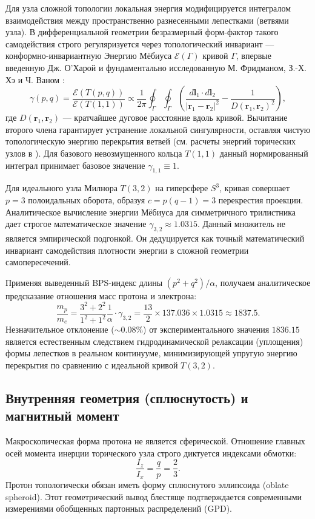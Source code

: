 \documentclass[11pt,a4paper]{article}
\begin{document}
Для узла сложной топологии локальная энергия модифицируется интегралом взаимодействия между пространственно разнесенными лепестками (ветвями узла). В дифференциальной геометрии безразмерный форм-фактор такого самодействия строго регуляризуется через топологический инвариант — конформно-инвариантную Энергию Мёбиуса $\mathcal{E}(\Gamma)$ кривой $\Gamma$, впервые введенную Дж. О'Харой \cite{ohara1991} и фундаментально исследованную М. Фридманом, З.-Х. Хэ и Ч. Ваном \cite{freedman1994}:
\begin{equation}
\gamma(p,q) = \frac{\mathcal{E}(T(p,q))}{\mathcal{E}(T(1,1))} \propto \frac{1}{2\pi} \oint_{\Gamma} \oint_{\Gamma} \left( \frac{d\mathbf{l}_1 \cdot d\mathbf{l}_2}{|\mathbf{r}_1 - \mathbf{r}_2|^2} - \frac{1}{D(\mathbf{r}_1, \mathbf{r}_2)^2} \right),
\end{equation}
где $D(\mathbf{r}_1, \mathbf{r}_2)$ — кратчайшее дуговое расстояние вдоль кривой. Вычитание второго члена гарантирует устранение локальной сингулярности, оставляя чистую топологическую энергию перекрытия ветвей (см. расчеты энергий торических узлов в \cite{kusner1998}). Для базового невозмущенного кольца $T(1,1)$ данный нормированный интеграл принимает базовое значение $\gamma_{1,1} \equiv 1$. 

Для идеального узла Милнора $T(3,2)$ на гиперсфере $S^3$, кривая совершает $p=3$ полоидальных оборота, образуя $c = p(q-1) = 3$ перекрестия проекции. Аналитическое вычисление энергии Мёбиуса для симметричного трилистника дает строгое математическое значение $\gamma_{3,2} \approx 1.0315$. 
Данный множитель не является эмпирической подгонкой. Он дедуцируется как точный математический инвариант самодействия плотности энергии в сложной геометрии самопересечений.

Применяя выведенный BPS-индекс длины $(p^2+q^2)/\alpha$, получаем аналитическое предсказание отношения масс протона и электрона:
\begin{equation}
\frac{m_p}{m_e} = \frac{3^2 + 2^2}{1^2 + 1^2} \frac{1}{\alpha} \cdot \gamma_{3,2} = \frac{13}{2} \times 137.036 \times 1.0315 \approx 1837.5.
\end{equation}
Незначительное отклонение ($\sim 0.08\%$) от экспериментального значения $1836.15$ является естественным следствием гидродинамической релаксации (уплощения) формы лепестков в реальном континууме, минимизирующей упругую энергию перекрытия по сравнению с идеальной кривой $T(3,2)$.

\subsection{Внутренняя геометрия (сплюснутость) и магнитный момент}
Макроскопическая форма протона не является сферической. Отношение главных осей момента инерции торического узла строго диктуется индексами обмотки:
\begin{equation}
\frac{I_z}{I_x} = \frac{q}{p} = \frac{2}{3}.
\end{equation}
Протон топологически обязан иметь форму сплюснутого эллипсоида (oblate spheroid). Этот геометрический вывод блестяще подтверждается современными измерениями обобщенных партонных распределений (GPD).
\end{document}
